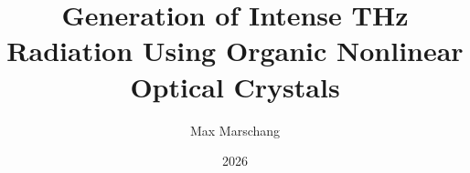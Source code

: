 \documentclass[
  tucolor,       %
  BCOR=12mm,     %
  parskip=half,  %
  open=any,      %
  cleardoublepage=plain,  %
]{tudothesis}
\author{Max Marschang}
\title{Generation of Intense THz Radiation Using Organic Nonlinear Optical Crystals}
\date{2026}
\begin{document}
\frontmatter
\maketitle

\makecorrectorpage


\tableofcontents

\mainmatter





\appendix


\backmatter
\printbibliography

\cleardoublepage

\end{document}
